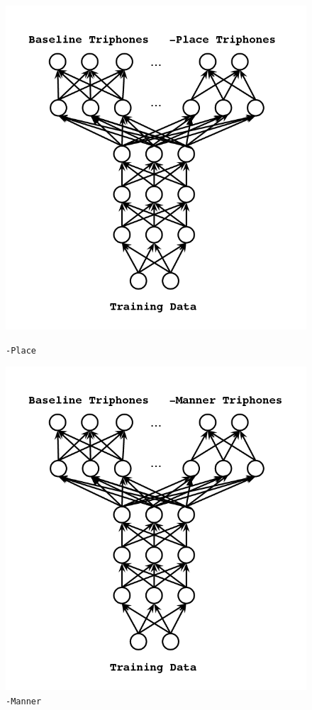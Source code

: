 \documentclass[10pt,a4paper]{article}
\begin{document}
\begin{enumerate}
\begin{figure}[!htb]
  \includegraphics[width=\linewidth]{figs/mtl-arch-place.png}
  \caption{\texttt{-Place}}
\endminipage\hfill
{}%
  \includegraphics[width=\linewidth]{figs/mtl-arch-manner.png}
  \caption{\texttt{-Manner}}
\endminipage
\end{figure}





\end{enumerate}
\end{document}
